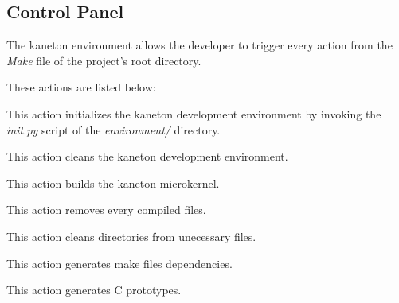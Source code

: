 %
%
%
%
%
%

%
%

\subsection{Control Panel}

The kaneton environment allows the developer to trigger every action from
the \textit{Make} file of the project's root directory.

These actions are listed below:

        {
	  This action initializes the kaneton development environment by
	  invoking the \textit{init.py} script of the \textit{environment/}
	  directory.

	  \-

	}

	{
	  This action cleans the kaneton development environment.

	  \-

	}

	{
	  This action builds the kaneton microkernel.

	  \-

	}

	{
	  This action removes every compiled files.

	  \-

	}

	{
	  This action cleans directories from unecessary files.

	  \-

	}

	{
	  This action generates make files dependencies.

	  \-

	}

	{
	  This action generates C prototypes.

	  \-

	}

